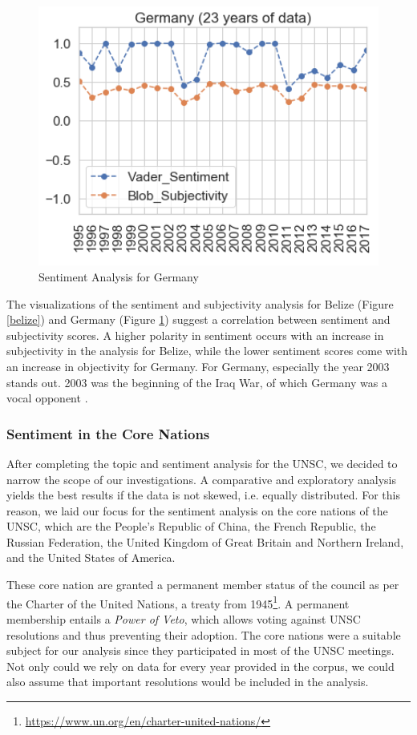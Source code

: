 \begin{figure}[t]
\begin{minipage}{0.47\textwidth}
        \includegraphics[width=1.1\textwidth]{img/Germany_average.png} %
        \caption{Sentiment Analysis for Germany}
        \label{germany}
    \end{minipage}
\end{figure}

The visualizations of the sentiment and subjectivity analysis for Belize (Figure \ref{belize}) and Germany (Figure \ref{germany}) suggest a correlation between sentiment and subjectivity scores. A higher polarity in sentiment occurs with an increase in subjectivity in the analysis for Belize, while the lower sentiment scores come with an increase in objectivity for Germany. For Germany, especially the year 2003 stands out. 2003 was the beginning of the Iraq War, of which Germany was a vocal opponent \citep{germiraq}.

\subsubsection{Sentiment in the Core Nations}
After completing the topic and sentiment analysis for the UNSC, we decided to narrow the scope of our investigations. A comparative and exploratory analysis yields the best results if the data is not skewed, i.e. equally distributed. For this reason, we laid our focus for the sentiment analysis on the core nations of the UNSC, which are the People's Republic of China, the French Republic, the Russian Federation, the United Kingdom of Great Britain and Northern Ireland, and the United States of America.

These core nation are granted a permanent member status of the council as per the Charter of the United Nations, a treaty from 1945\footnote{\href{https://www.un.org/en/charter-united-nations/}{https://www.un.org/en/charter-united-nations/}}. A permanent membership entails a \textit{Power of Veto}, which allows voting against UNSC resolutions and thus preventing their adoption. 
The core nations were a suitable subject for our analysis since they participated in most of the UNSC meetings. Not only could we rely on data for every year provided in the corpus, we could also assume that important resolutions would be included in the analysis.

